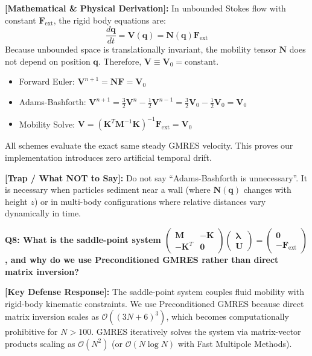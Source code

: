 \documentclass[11pt,a4paper]{article}
\newcommand{\question}[2]{
    \vspace{0.4cm}
    \noindent\colorbox{blue!10}{\parbox{\dimexpr\textwidth-2\fboxsep\relax}{
        \textbf{#1: #2}
    }}
    \vspace{0.2cm}
}
\newcommand{\shortanswer}[1]{
    \noindent\textbf{\textcolor{green!50!black}{[Key Defense Response]:}} #1
    \vspace{0.2cm}
}
\newcommand{\deepdetails}[1]{
    \noindent\textbf{\textcolor{blue!60!black}{[Mathematical \& Physical Derivation]:}} #1
    \vspace{0.2cm}
}
\newcommand{\pitfall}[1]{
    \noindent\textbf{\textcolor{red!70!black}{[Trap / What NOT to Say]:}} #1
    \vspace{0.3cm}
}
\begin{document}
\deepdetails{
In unbounded Stokes flow with constant $\mathbf{F}_{\text{ext}}$, the rigid body equations are:
\begin{equation}
    \frac{d\mathbf{q}}{dt} = \mathbf{V}(\mathbf{q}) = \mathbf{N}(\mathbf{q}) \mathbf{F}_{\text{ext}}
\end{equation}
Because unbounded space is translationally invariant, the mobility tensor $\mathbf{N}$ does not depend on position $\mathbf{q}$. Therefore, $\mathbf{V} \equiv \mathbf{V}_0 = \text{constant}$.
\begin{itemize}
    \item Forward Euler: $\mathbf{V}^{n+1} = \mathbf{N} \mathbf{F} = \mathbf{V}_0$
    \item Adams-Bashforth: $\mathbf{V}^{n+1} = \frac{3}{2}\mathbf{V}^n - \frac{1}{2}\mathbf{V}^{n-1} = \frac{3}{2}\mathbf{V}_0 - \frac{1}{2}\mathbf{V}_0 = \mathbf{V}_0$
    \item Mobility Solve: $\mathbf{V} = (\mathbf{K}^T \mathbf{M}^{-1} \mathbf{K})^{-1} \mathbf{F}_{\text{ext}} = \mathbf{V}_0$
\end{itemize}
All schemes evaluate the exact same steady GMRES velocity. This proves our implementation introduces zero artificial temporal drift.
}

\pitfall{Do not say ``Adams-Bashforth is unnecessary''. It is necessary when particles sediment near a wall (where $\mathbf{N}(\mathbf{q})$ changes with height $z$) or in multi-body configurations where relative distances vary dynamically in time.}

\vspace{0.4cm}
\question{Q8}{What is the saddle-point system $\begin{pmatrix} \mathbf{M} & -\mathbf{K} \\ -\mathbf{K}^T & \mathbf{0} \end{pmatrix} \begin{pmatrix} \boldsymbol{\lambda} \\ \mathbf{U} \end{pmatrix} = \begin{pmatrix} \mathbf{0} \\ -\mathbf{F}_{\text{ext}} \end{pmatrix}$, and why do we use Preconditioned GMRES rather than direct matrix inversion?}

\shortanswer{The saddle-point system couples fluid mobility with rigid-body kinematic constraints. We use Preconditioned GMRES because direct matrix inversion scales as $\mathcal{O}((3N+6)^3)$, which becomes computationally prohibitive for $N > 100$. GMRES iteratively solves the system via matrix-vector products scaling as $\mathcal{O}(N^2)$ (or $\mathcal{O}(N \log N)$ with Fast Multipole Methods).}
\end{document}
